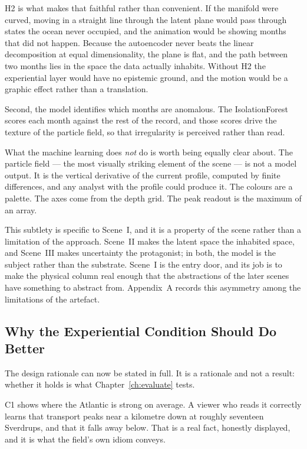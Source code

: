H2 is what makes that faithful rather than convenient. If the manifold were curved, moving in a straight line through the latent plane would pass through states the ocean never occupied, and the animation would be showing months that did not happen. Because the autoencoder never beats the linear decomposition at equal dimensionality, the plane is flat, and the path between two months lies in the space the data actually inhabits. Without H2 the experiential layer would have no epistemic ground, and the motion would be a graphic effect rather than a translation.

Second, the model identifies which months are anomalous. The IsolationForest scores each month against the rest of the record, and those scores drive the texture of the particle field, so that irregularity is perceived rather than read.

What the machine learning does \emph{not} do is worth being equally clear about. The particle field --- the most visually striking element of the scene --- is not a model output. It is the vertical derivative of the current profile, computed by finite differences, and any analyst with the profile could produce it. The colours are a palette. The axes come from the depth grid. The peak readout is the maximum of an array.

This subtlety is specific to Scene~I, and it is a property of the scene rather than a limitation of the approach. Scene~II makes the latent space the inhabited space, and Scene~III makes uncertainty the protagonist; in both, the model is the subject rather than the substrate. Scene~I is the entry door, and its job is to make the physical column real enough that the abstractions of the later scenes have something to abstract from. Appendix~A records this asymmetry among the limitations of the artefact.

\subsection{Why the Experiential Condition Should Do Better}
\label{subsec:column-rationale}

The design rationale can now be stated in full. It is a rationale and not a result: whether it holds is what Chapter~\ref{ch:evaluate} tests.

C1 shows where the Atlantic is strong on average. A viewer who reads it correctly learns that transport peaks near a kilometre down at roughly seventeen Sverdrups, and that it falls away below. That is a real fact, honestly displayed, and it is what the field's own idiom conveys.

